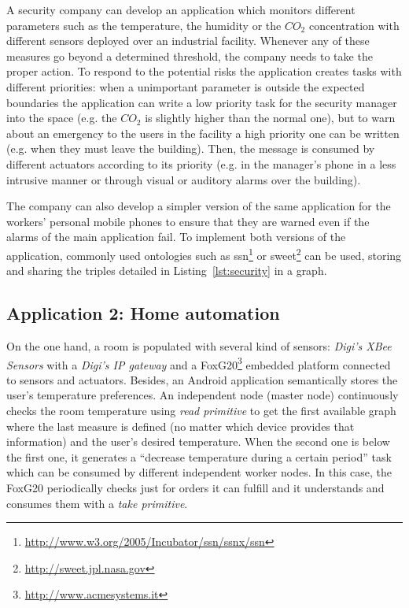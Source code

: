 A security company can develop an application which monitors different parameters such as the temperature,
the humidity or the $CO_2$ concentration with different sensors deployed over an industrial facility.
Whenever any of these measures go beyond a determined threshold, the company needs to take the proper action.
To respond to the potential risks the application creates tasks with different priorities:
when a unimportant parameter is outside the expected boundaries the application can write a low priority task for the security manager into the space
(e.g. the $CO_2$ is slightly higher than the normal one),
but to warn about an emergency to the users in the facility a high priority one can be written
(e.g. when they must leave the building).
Then, the message is consumed by different actuators according to its priority
(e.g. in the manager's phone in a less intrusive manner or through visual or auditory alarms over the building).

The company can also develop a simpler version of the same application for the workers' personal mobile phones to ensure that they are warned even if the alarms of the main application fail.
To implement both versions of the application, commonly used ontologies such as
\ac{ssn}\footnote{\url{http://www.w3.org/2005/Incubator/ssn/ssnx/ssn}} or
\ac{sweet}\footnote{\url{http://sweet.jpl.nasa.gov}} can be used,
storing and sharing the triples detailed in Listing~\ref{lst:security} in a graph.


\subsection{Application 2: Home automation}

On the one hand, a room is populated with several kind of sensors:
\textit{Digi's XBee Sensors} with a \textit{Digi's IP gateway}
and a FoxG20\footnote{\url{http://www.acmesystems.it}} embedded platform connected to sensors and actuators.
Besides, an Android application semantically stores the user's temperature preferences.
An independent node (master node) continuously checks the room temperature using \textit{read primitive} to get the first available graph where the last measure is defined (no matter which device provides that information) and the user's desired temperature.
When the second one is below the first one, it generates a ``decrease temperature during a certain period'' task which can be consumed by different independent worker nodes.
In this case, the FoxG20 periodically checks just for orders it can fulfill and it understands and consumes them with a \textit{take primitive}.

